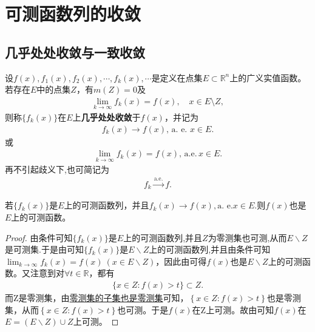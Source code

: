 \documentclass[../../main.tex]{subfiles}
\begin{document}
\section{可测函数列的收敛}

\subsection{几乎处处收敛与一致收敛}

\begin{definition}[几乎处处收敛]
设$f(x), f_1(x), f_2(x), \cdots, f_k(x), \cdots$是定义在点集$E \subset \mathbb{R}^n$上的广义实值函数。若存在$E$中的点集$Z$，有$m(Z) = 0$及
\begin{align*}
\lim_{k \to \infty} f_k(x) = f(x), \quad x \in E \setminus Z,
\end{align*}
则称$\{f_k(x)\}$在$E$上\textbf{几乎处处收敛}于$f(x)$，并记为
\begin{align*}
f_k(x) \to f(x),\,\text{a. e. } x \in E.
\end{align*}
或
\begin{align*}
\lim_{k \to \infty} f_k(x) = f(x),\,\text{a.e.}\, x \in E.
\end{align*}
再不引起歧义下,也可简记为
\begin{align*}
f_k\xrightarrow{\mathrm{a}.\mathrm{e}.}f.
\end{align*}
\end{definition}

\begin{theorem}
若$\{f_k(x)\}$是$E$上的可测函数列，并且$f_k(x) \to f(x),\text{a. e.} x \in E.$则$f(x)$也是$E$上的可测函数。
\end{theorem}
\begin{proof}
由条件可知\(\{ f_k(x) \}\)是\(E\)上的可测函数列,并且$Z$为零测集也可测,从而\(E\backslash Z\)是可测集.于是由可知\(\{ f_k(x) \}\)是\(E\backslash Z\)上的可测函数列,并且由条件可知\(\lim_{k\rightarrow \infty}f_k(x) =f(x) \ (x\in E\backslash Z)\)，因此由可得\(f(x)\)也是\(E\backslash Z\)上的可测函数。又注意到对\(\forall t\in \mathbb{R}\)，都有
\begin{align*}
\{ x\in Z:f (x) >t \} \subset Z.
\end{align*}
而Z是零测集，由\hyperref[proposition:零测集的基本性质]{零测集的子集也是零测集}可知，\(\left\{ x\in Z:f(x) >t \right\}\)也是零测集，从而\(\left\{ x\in Z:f(x) >t \right\}\)也可测。于是\(f(x)\)在Z上可测。故由可知\(f(x)\)在\(E=(E\backslash Z)\cup Z\)上可测。

\end{proof}
\end{document}
